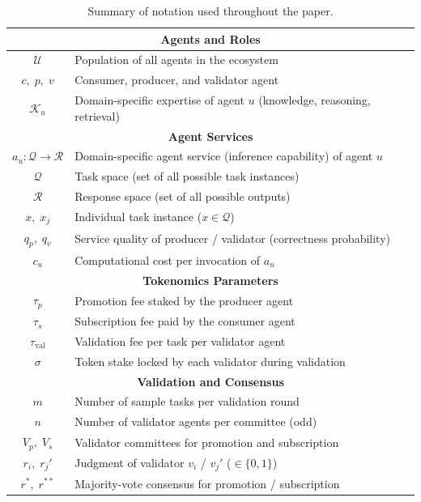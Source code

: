 \begin{table}[!htbp]
\centering
\caption{Summary of notation used throughout the paper.}
\vspace{2mm}
\setlength{\tabcolsep}{6pt}
\renewcommand{\arraystretch}{1.20}
\small
\begin{tabular}{cl}
\toprule
\multicolumn{2}{c}{\textbf{Agents and Roles}} \\
\midrule
$\mathcal{U}$ & Population of all agents in the ecosystem \\
$c,\; p,\; v$ & Consumer, producer, and validator agent \\
$\mathcal{K}_u$ & Domain-specific expertise of agent $u$ (knowledge, reasoning, retrieval) \\
\midrule
\multicolumn{2}{c}{\textbf{Agent Services}} \\
\midrule
$a_u\!:\! \mathcal{Q} \!\to\! \mathcal{R}$ & Domain-specific agent service (inference capability) of agent $u$ \\
$\mathcal{Q}$ & Task space (set of all possible task instances) \\
$\mathcal{R}$ & Response space (set of all possible outputs) \\
$x,\; x_j$ & Individual task instance ($x \in \mathcal{Q}$) \\
$q_p,\; q_v$ & Service quality of producer / validator (correctness probability) \\
$c_u$ & Computational cost per invocation of $a_u$ \\
\midrule
\multicolumn{2}{c}{\textbf{Tokenomics Parameters}} \\
\midrule
$\tau_p$ & Promotion fee staked by the producer agent \\
$\tau_s$ & Subscription fee paid by the consumer agent \\
$\tau_{\text{val}}$ & Validation fee per task per validator agent \\
$\sigma$ & Token stake locked by each validator during validation \\
\midrule
\multicolumn{2}{c}{\textbf{Validation and Consensus}} \\
\midrule
$m$ & Number of sample tasks per validation round \\
$n$ & Number of validator agents per committee (odd) \\
$V_p,\; V_s$ & Validator committees for promotion and subscription \\
$r_i,\; r_j'$ & Judgment of validator $v_i$ / $v_j'$ ($\in \{0,1\}$) \\
$r^*,\; r^{**}$ & Majority-vote consensus for promotion / subscription \\

\end{tabular}
\end{table}
